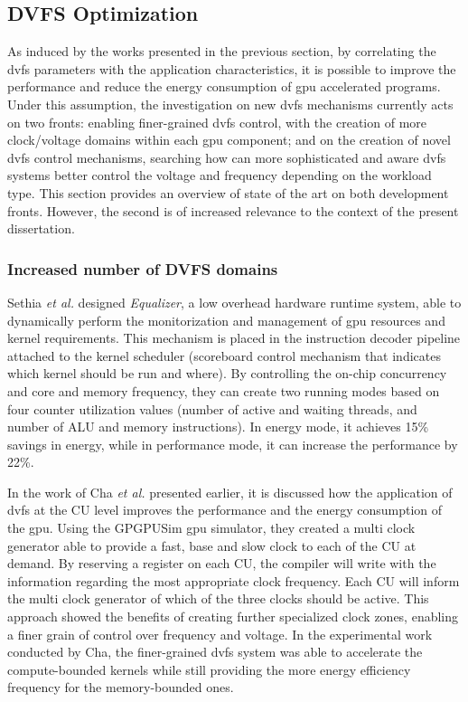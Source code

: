 \subsection{DVFS Optimization}
\label{section:DVFS_opt}

As induced by the works presented in the previous section, by correlating the \acrshort{dvfs} parameters with the application characteristics, it is possible to improve the performance and reduce the energy consumption of \acrshort{gpu} accelerated programs. Under this assumption, the investigation on new \acrshort{dvfs} mechanisms currently acts on two fronts: enabling finer-grained \acrshort{dvfs} control, with the creation of more clock/voltage domains within each \acrshort{gpu} component; and on the creation of novel \acrshort{dvfs} control mechanisms, searching how can more sophisticated and aware \acrshort{dvfs} systems better control the voltage and frequency depending on the workload type. This section provides an overview of state of the art on both development fronts. However, the second is of increased relevance to the context of the present dissertation.

\subsubsection{Increased number of DVFS domains}


Sethia \textit{et al.} \cite{sethia_equalizer:_2014} designed \textit{Equalizer}, a low overhead hardware runtime system, able to dynamically perform the monitorization and management of \acrshort{gpu} resources and kernel requirements. This mechanism is placed in the instruction decoder pipeline attached to the kernel scheduler (scoreboard control mechanism that indicates which kernel should be run and where). By controlling the on-chip concurrency and core and memory frequency, they can create two running modes based on four counter utilization values (number of active and waiting threads, and number of ALU and memory instructions). In energy mode, it achieves 15\% savings in energy, while in performance mode, it can increase the performance by 22\%.

In the work of Cha \textit{et al.} \cite{cha_core-level_2018} presented earlier, it is discussed how the application of \acrshort{dvfs} at the CU level improves the performance and the energy consumption of the \acrshort{gpu}. Using the GPGPUSim \acrshort{gpu} simulator, they created a multi clock generator able to provide a fast, base and slow clock to each of the CU at demand.  By reserving a register on each CU, the compiler will write with the information regarding the most appropriate clock frequency. Each CU will inform the multi clock generator of which of the three clocks should be active. This approach showed the benefits of creating further specialized clock zones, enabling a finer grain of control over frequency and voltage. In the experimental work conducted by Cha, the finer-grained \acrshort{dvfs} system was able to accelerate the compute-bounded kernels while still providing the more energy efficiency frequency for the memory-bounded ones.

